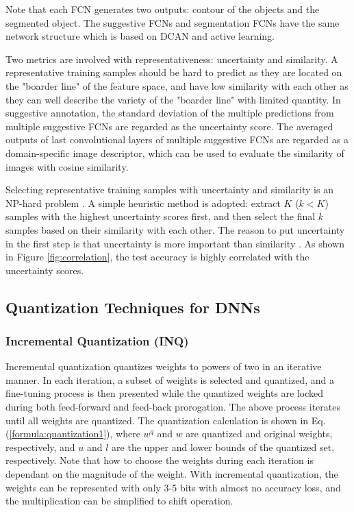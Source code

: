 \documentclass[10pt,twocolumn,letterpaper]{article}
\begin{document}
Note that each FCN generates two outputs: contour of the objects and the segmented object.
The suggestive FCNs and segmentation FCNs have the same network structure which is based on DCAN \cite{chen2016dcan} and active learning.

Two metrics are involved with representativeness: uncertainty and similarity.
A representative training samples should be hard to predict as they are located on the "boarder line" of the feature space, and have low similarity with each other as they can well describe the variety of the "boarder line" with limited quantity.
In suggestive annotation, the standard deviation of the multiple predictions from multiple suggestive FCNs are regarded as the uncertainty score.
The averaged outputs of last convolutional layers of multiple suggestive FCNs are regarded as a domain-specific image descriptor, which can be used to evaluate the similarity of images with cosine similarity.

Selecting representative training samples with uncertainty and similarity is an NP-hard problem \cite{yang2017suggestive}.
A simple heuristic method is adopted: extract $K$ ($k<K$) samples with the highest uncertainty scores first, and then select the final $k$ samples based on their similarity with each other.
The reason to put uncertainty in the first step is that uncertainty is more important than similarity \cite{yang2017suggestive}.
As shown in Figure \ref{fig:correlation}, the test accuracy is highly correlated with the uncertainty scores.

\subsection{Quantization Techniques for DNNs}
\subsubsection{Incremental Quantization (INQ)}


Incremental quantization \cite{zhou2017incremental} quantizes weights to powers of two in an iterative manner.
In each iteration, a subset of weights is selected and quantized, and a fine-tuning process is then presented while the quantized weights are locked during both feed-forward and feed-back prorogation.
The above process iterates until all weights are quantized.
The quantization calculation is shown in Eq. (\ref{formula:quantization1}), where $w^q$ and $w$ are quantized and original weights, respectively, and $u$ and $l$ are the upper and lower bounds of the quantized set, respectively.
Note that how to choose the weights during each iteration is dependant on the magnitude of the weight.
With incremental quantization, the weights can be represented with only 3-5 bits with almost no accuracy loss, and the multiplication can be simplified to shift operation.
\end{document}

